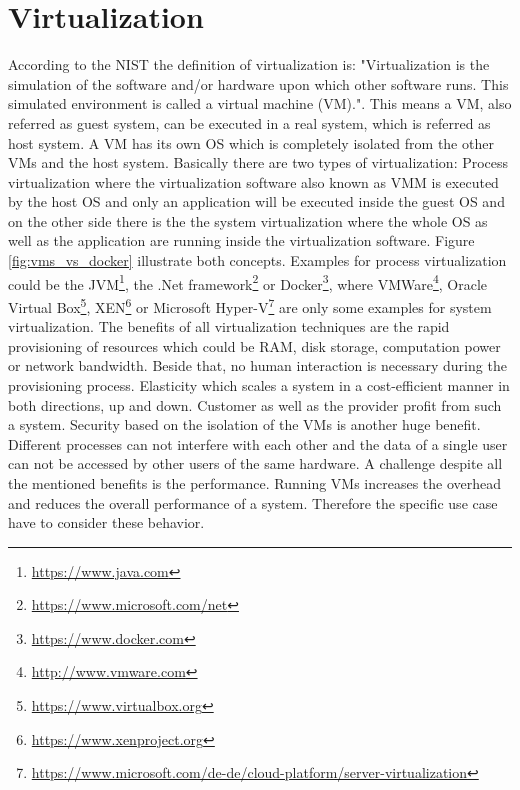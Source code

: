 \section{Virtualization}
According to the \ac{NIST} the definition of virtualization is: "Virtualization is the simulation of the software and/or hardware upon which other software runs. This simulated environment is called a virtual machine (VM)."\autocite[p. ES-1]{Sca:2011}.
This means a \ac{VM}, also referred as guest system, can be executed in a real system, which is referred as host system.
A \ac{VM} has its own \ac{OS} which is completely isolated from the other \acp{VM} and the host system.\autocite[cf.][p. 2]{Celesti:2016}
Basically there are two types of virtualization: Process virtualization where the virtualization software also known as \ac{VMM} is executed by the host \ac{OS} and only an application will be executed inside the guest \ac{OS} and on the other side there is the the system virtualization where the whole \ac{OS} as well as the application are running inside the virtualization software.
Figure \ref{fig:vms_vs_docker} illustrate both concepts.
Examples for process virtualization could be the \ac{JVM}\footnote{\url{https://www.java.com}}, the .Net framework\footnote{\url{https://www.microsoft.com/net}} or Docker\footnote{\url{https://www.docker.com}}, where VMWare\footnote{\url{http://www.vmware.com}}, Oracle Virtual Box\footnote{\url{https://www.virtualbox.org}}, XEN\footnote{\url{https://www.xenproject.org}} or Microsoft Hyper-V\footnote{\url{https://www.microsoft.com/de-de/cloud-platform/server-virtualization}} are only some examples for system virtualization.
The benefits of all virtualization techniques are the rapid provisioning of resources which could be \ac{RAM}, disk storage, computation power or network bandwidth.
Beside that, no human interaction is necessary during the provisioning process.
Elasticity which scales a system in a cost-efficient manner in both directions, up and down.
Customer as well as the provider profit from such a system.
Security based on the isolation of the \acp{VM} is another huge benefit.
Different processes can not interfere with each other and the data of a single user can not be accessed by other users of the same hardware.
A challenge despite all the mentioned benefits is the performance.
Running \acp{VM} increases the overhead and reduces the overall performance of a system.
Therefore the specific use case have to consider these behavior.

